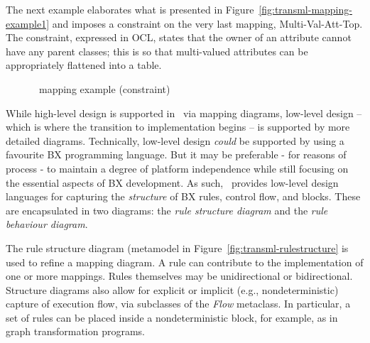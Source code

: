 The next example elaborates what is presented in Figure~\ref{fig:transml-mapping-example1} and imposes a constraint on the very last mapping, Multi-Val-Att-Top. The constraint, expressed in OCL, states that the owner of an attribute cannot have any parent classes; this is so that multi-valued attributes can be appropriately flattened into a table.

\begin{figure}[htbp]
\caption{\transml\ mapping example (constraint)}
\label{fig:architecture-example3}
\end{figure}

While high-level design is supported in \transml\ via mapping diagrams, low-level design -- which is where the transition to implementation begins -- is
supported by more detailed diagrams. Technically, low-level design \textit{could} be supported by using a favourite BX programming language. But it may be preferable - for reasons of process - to maintain a degree of platform independence while still focusing on the essential aspects of BX development. As such, \transml\ provides low-level design languages for capturing the \textit{structure} of BX rules, control flow, and blocks. These are encapsulated in two diagrams: the \textit{rule structure diagram} and the \textit{rule behaviour diagram}.

The rule structure diagram (metamodel in Figure~\ref{fig:transml-rulestructure} is used to refine a mapping diagram. A rule can contribute to the implementation of one or more mappings. Rules themselves may be unidirectional or bidirectional. Structure diagrams also allow for explicit or implicit (e.g., nondeterministic) capture of execution flow, via subclasses of the \textit{Flow} metaclass. In particular, a set of rules can be placed inside a nondeterministic block, for example, as in graph transformation programs.


